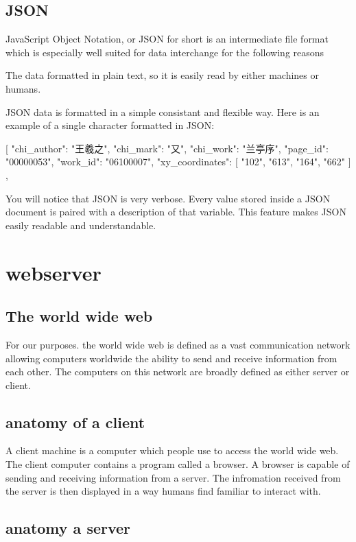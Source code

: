 \subsection{JSON}

JavaScript Object Notation, or JSON for short is an intermediate file format which is especially well suited for data interchange for the following reasons

The data formatted in plain text, so it is easily read by either machines or humans.

JSON data is formatted in a simple consistant and flexible way.  Here is an example of a single character formatted in JSON:

[
{
  "chi_author": "王羲之",
  "chi_mark": "又",
  "chi_work": "兰亭序",
  "page_id": "00000053",
  "work_id": "06100007",
  "xy_coordinates": [
  "102",
  "613",
  "164",
  "662"
  ]
},

You will notice that JSON is very verbose.  Every value stored inside a JSON document is paired with a description of that variable.  This feature makes JSON easily readable and understandable.



\section{webserver}

\subsection{The world wide web}

For our purposes. the world wide web is defined as a vast communication network allowing computers worldwide the ability to send and receive information from each other.  The computers on this network are broadly defined as either server or client.

\subsection{anatomy of a client}

A client machine is a computer which people use to access the world wide web.  The client computer contains a program called a browser.  A browser is capable of sending and receiving information from a server.  The infromation received from the server is then displayed in a way humans find familiar to interact with.

\subsection{anatomy a server}

